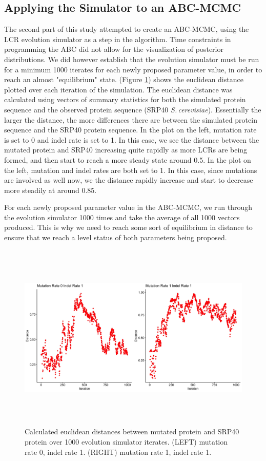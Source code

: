 \documentclass[10pt]{article}
\providecommand{\figref}[1]{(Figure \ref{#1})}  %
\newcommand{\scshrt}{\mbox{\textit{S.\,cerevisiae}}\xspace}
\begin{document}
\subsection{Applying the Simulator to an ABC-MCMC}

The second part of this study attempted to create an ABC-MCMC, using the LCR evolution simulator as a step in the algorithm. Time constraints in programming the ABC did not allow for the visualization of posterior distributions. We did however establish that the evolution simulator must be run for a minimum 1000 iterates for each newly proposed parameter value, in order to reach an almost "equilibrium" state. \figref{fig:5} shows the euclidean distance plotted over each iteration of the simulation. The euclidean distance was calculated using vectors of summary statistics for both the simulated protein sequence and the observed protein sequence (SRP40 \scshrt). Essentially the larger the distance, the more differences there are between the simulated protein sequence and the SRP40 protein sequence. In the plot on the left, mutation rate is set to 0 and indel rate is set to 1. In this case, we see the distance between the mutated protein and SRP40 increasing quite rapidly as more LCRs are being formed, and then start to reach a more steady state around 0.5. In the plot on the left, mutation and indel rates are both set to 1. In this case, since mutations are involved as well now, we the distance rapidly increase and start to decrease more steadily at around 0.85.

For each newly proposed parameter value in the ABC-MCMC, we run through the evolution simulator 1000 times and take the average of all 1000 vectors produced. This is why we need to reach some sort of equilibrium in distance to ensure that we reach a level status of both parameters being proposed.

\begin{figure}[H]
	\includegraphics[width=18cm, height=9cm]{distances.jpeg}
	\caption{Calculated euclidean distances between mutated protein and SRP40 protein over 1000 evolution simulator iterates. (LEFT) mutation rate 0, indel rate 1. (RIGHT) mutation rate 1, indel rate 1.}
	\label{fig:5}
\end{figure}
\newpage
\end{document}
